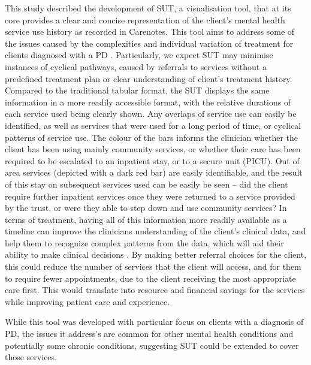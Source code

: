 \documentclass{article}
\begin{document}
This study described the development of SUT, a visualisation tool, that at its core provides a clear and concise representation of the client’s mental health service use history as recorded in Carenotes. This tool aims to address some of the issues caused by the complexities and individual variation of treatment for clients diagnosed with a PD \cite{Bolton2014}. Particularly, we expect SUT may minimise instances of cyclical pathways, caused by referrals to services without a predefined treatment plan or clear understanding of client’s treatment history.
Compared to the traditional tabular format, the SUT displays the same information in a more readily accessible format, with the relative durations of each service used being clearly shown. Any overlaps of service use can easily be identified, as well as services that were used for a long period of time, or cyclical patterns of service use. The colour of the bars informs the clinician whether the client has been using mainly community services, or whether their care has been required to be escalated to an inpatient stay, or to a secure unit (PICU). Out of area services (depicted with a dark red bar) are easily identifiable, and the result of this stay on subsequent services used can be easily be seen – did the client require further inpatient services once they were returned to a service provided by the trust, or were they able to step down and use community services? 
In terms of treatment, having all of this information more readily available as a timeline can improve the clinicians understanding of the client’s clinical data, and help them to recognize complex patterns from the data, which will aid their ability to make clinical decisions \cite{Ledesma2019}. By making better referral choices for the client, this could reduce the number of services that the client will access, and for them to require fewer appointments, due to the client receiving the most appropriate care first. This would translate into  resource and financial savings for the services while improving patient care and experience.

While this tool was developed with particular focus on clients with a diagnosis of PD, the issues it address’s are common for other mental health conditions and potentially some chronic conditions, suggesting SUT could be extended to cover those services.
\end{document}
